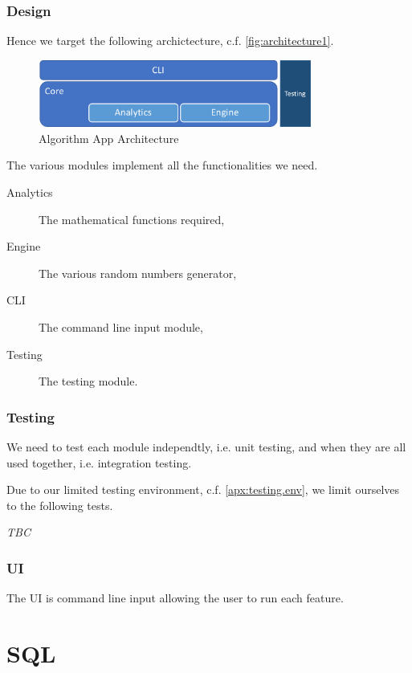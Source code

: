 \documentclass[12pt,a4paper,article]{memoir} %
\begin{document}
\subsection{Design}
Hence we target the following archictecture, c.f. \autoref{fig:architecture1}.
\begin{figure}[h!]
\begin{center}
\includegraphics[width=0.8\textwidth]{img/architecture1.png}
\caption{Algorithm App Architecture}
\label{fig:architecture1}
\end{center}
\end{figure}
The various modules implement all the functionalities we need.
\begin{description}
	\item[Analytics] The mathematical functions required,
	\item[Engine] 	The various random numbers generator,
	\item[CLI] 		The command line input module,
	\item[Testing] 	The testing module. 
\end{description}

\subsection{Testing}
We need to test each module independtly, i.e. unit testing, and when they 
are all used together, i.e. integration testing.

Due to our limited testing environment, c.f. \autoref{apx:testing.env},
we limit ourselves to the following tests.

\emph{TBC}

\subsection{UI}
The UI is command line input allowing the user to run each feature.

\newpage
\chapter{SQL}
\end{document}

